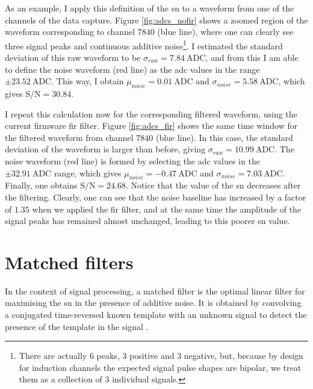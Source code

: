 As an example, I apply this definition of the \gls{sn} to a waveform from one of the channels of the data capture. Figure \ref{fig:adcs_nofir} shows a zoomed region of the waveform corresponding to channel $7840$ (blue line), where one can clearly see three signal peaks and continuous additive noise\footnote{There are actually 6 peaks, 3 positive and 3 negative, but, because by design for induction channels the expected signal pulse shapes are bipolar, we treat them as a collection of 3 individual signals.}. I estimated the standard deviation of this raw waveform to be $\sigma_{raw} = 7.84 ~ \mathrm{ADC}$, and from this I am able to define the noise waveform (red line) as the \gls{adc} values in the range $\pm 23.52 ~ \mathrm{ADC}$. This way, I obtain $\mu_{noise} = 0.01 ~ \mathrm{ADC}$ and $\sigma_{noise} = 5.58 ~ \mathrm{ADC}$, which gives $\mathrm{S/N} = 30.84$.

I repeat this calculation now for the corresponding filtered waveform, using the current firmware \gls{fir} filter. Figure \ref{fig:adcs_fir} shows the same time window for the filtered waveform from channel $7840$ (blue line). In this case, the standard deviation of the waveform is larger than before, giving $\sigma_{raw} = 10.99 ~ \mathrm{ADC}$. The noise waveform (red line) is formed by selecting the \gls{adc} values in the $\pm 32.91 ~ \mathrm{ADC}$ range, which gives $\mu_{noise} = -0.47 ~ \mathrm{ADC}$ and $\sigma_{noise} = 7.03 ~ \mathrm{ADC}$. Finally, one obtains $\mathrm{S/N} = 24.68$. Notice that the value of the \gls{sn} decreases after the filtering. Clearly, one can see that the noise baseline has increased by a factor of $1.35$ when we applied the \gls{fir} filter, and at the same time the amplitude of the signal peaks has remained almost unchanged, leading to this poorer \gls{sn} value.

\section{Matched filters}
\label{sec:matched_filter_matched_filter}

In the context of signal processing, a matched filter is the optimal linear filter for maximising the \gls{sn} in the presence of additive noise. It is obtained by convolving a conjugated time-reversed known template with an unknown signal to detect the presence of the template in the signal \cite{Turin1960}.

